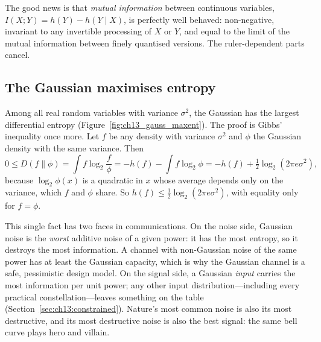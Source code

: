 The good news is that \emph{mutual information} between continuous variables,
$I(X;Y)=h(Y)-h(Y\mid X)$, is perfectly well behaved: non-negative, invariant to any invertible
processing of $X$ or $Y$, and equal to the limit of the mutual information between finely quantised
versions. The ruler-dependent parts cancel.


\subsection{The Gaussian maximises entropy}

Among all real random variables with variance $\sigma^2$, the Gaussian has the largest differential
entropy (Figure~\ref{fig:ch13_gauss_maxent}). The proof is Gibbs' inequality once more. Let $f$ be
any density with variance $\sigma^2$ and $\phi$ the Gaussian density with the same variance. Then
\begin{equation}
0\le D(f\|\phi)=\int f\log_2\frac f\phi=-h(f)-\int f\log_2\phi
=-h(f)+\tfrac12\log_2(2\pi e\sigma^2),
\label{eq:ch13:maxent}
\end{equation}
because $\log_2\phi(x)$ is a quadratic in $x$ whose average depends only on the variance, which $f$
and $\phi$ share. So $h(f)\le\frac12\log_2(2\pi e\sigma^2)$, with equality only for $f=\phi$.

This single fact has two faces in communications. On the noise side, Gaussian noise is the
\emph{worst} additive noise of a given power: it has the most entropy, so it destroys the most
information. A channel with non-Gaussian noise of the same power has at least the Gaussian
capacity, which is why the Gaussian channel is a safe, pessimistic design model. On the signal
side, a Gaussian \emph{input} carries the most information per unit power; any other input
distribution---including every practical constellation---leaves something on the table
(Section~\ref{sec:ch13:constrained}). Nature's most common noise is also its most destructive, and
its most destructive noise is also the best signal: the same bell curve plays hero and villain.

